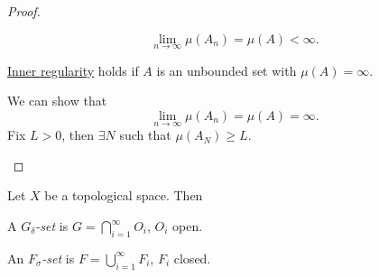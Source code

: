 \begin{proof}
\begin{enumerate}[(a)]
\begin{explanation}
			      \[
				      \lim_{n \to \infty} \mu (A_{n}) = \mu (A) < \infty .
			      \]
		      \end{explanation}
		      \begin{claim}
			      \hyperref[thm:inner-regularity]{Inner regularity} holds if \(A\) is an unbounded set with \(\mu (A) = \infty \).
		      \end{claim}
		      \begin{explanation}
			      We can show that
			      \[
				      \lim_{n \to \infty} \mu (A_{n}) = \mu (A) = \infty.
			      \]
			      Fix \(L>0\), then \(\exists N\) such that \(\mu (A_{N})\geq L\).
		      \end{explanation}
	\end{enumerate}
\end{proof}

\begin{definition*}
	Let \(X\) be a topological space. Then
	\begin{definition}\label{def:G-delta-set}
		A \emph{\(G_{\delta}\)-set} is \(G = \bigcap_{i=1}^{\infty} O_{i}\), \(O_{i}\) open.
	\end{definition}

	\begin{definition}\label{def:F-sigma-set}
		An \emph{\(F_{\sigma}\)-set} is \(F = \bigcup_{i=1}^{\infty} F_{i}\), \(F_{i}\) closed.
	\end{definition}
\end{definition*}

